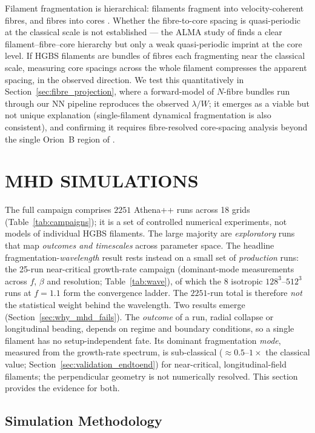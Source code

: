 \documentclass[usenatbib,twoside,twocolumn]{mnras}
\begin{document}
Filament fragmentation is hierarchical: filaments fragment into velocity-coherent fibres, and fibres into cores \citep{Hacar2013,Hacar2018,Yang2024}. Whether the fibre-to-core spacing is quasi-periodic at the classical scale is not established --- the ALMA study of \citet{Yang2024} finds a clear filament--fibre--core hierarchy but only a weak quasi-periodic imprint at the core level. If HGBS filaments are bundles of fibres each fragmenting near the classical scale, measuring core spacings across the whole filament compresses the apparent spacing, in the observed direction. We test this quantitatively in Section~\ref{sec:fibre_projection}, where a forward-model of $N$-fibre bundles run through our NN pipeline reproduces the observed $\lambda/W$; it emerges as a viable but not unique explanation (single-filament dynamical fragmentation is also consistent), and confirming it requires fibre-resolved core-spacing analysis beyond the single Orion~B region of \citet{Yang2024}.

\section{MHD SIMULATIONS}

The full campaign comprises $2251$ Athena++ runs across 18 grids (Table~\ref{tab:campaigns}); it is a set of controlled numerical experiments, not models of individual HGBS filaments. The large majority are \emph{exploratory} runs that map \emph{outcomes and timescales} across parameter space. The headline fragmentation-\emph{wavelength} result rests instead on a small set of \emph{production} runs: the 25-run near-critical growth-rate campaign (dominant-mode measurements across $f$, $\beta$ and resolution; Table~\ref{tab:wave}), of which the 8 isotropic $128^3$--$512^3$ runs at $f=1.1$ form the convergence ladder. The $2251$-run total is therefore \emph{not} the statistical weight behind the wavelength. Two results emerge (Section~\ref{sec:why_mhd_fails}). The \emph{outcome} of a run, radial collapse or longitudinal beading, depends on regime and boundary conditions, so a single filament has no setup-independent fate. Its dominant fragmentation \emph{mode}, measured from the growth-rate spectrum, is sub-classical ($\approx0.5$--$1\times$ the classical value; Section~\ref{sec:validation_endtoend}) for near-critical, longitudinal-field filaments; the perpendicular geometry is not numerically resolved. This section provides the evidence for both.

\subsection{Simulation Methodology}
\end{document}
